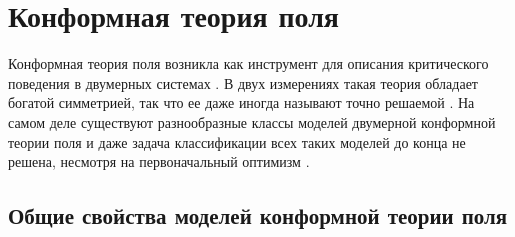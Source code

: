 

\chapter{Конформная теория поля}
\label{cha:CFT}

Конформная теория поля возникла как инструмент для описания критического поведения в двумерных системах \cite{Polyakov:1970xd}. В двух измерениях такая теория обладает богатой симметрией, так что ее даже иногда называют точно решаемой \cite{belavin1984ics}. На самом деле существуют разнообразные классы моделей двумерной конформной теории поля и даже задача классификации всех таких моделей до конца не решена, несмотря на первоначальный оптимизм \cite{moore1989taming}.

\section{Общие свойства моделей конформной теории поля}
\label{sec:conformal-field-theory-general}


